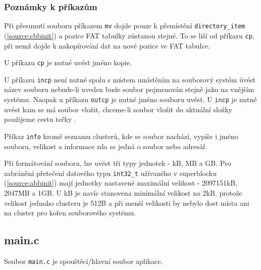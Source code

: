 \documentclass[12pt]{report}
\begin{document}
	\subsubsection{Poznámky k příkazům}
	\par Při přesunutí souboru příkazem \texttt{mv} dojde pouze k přemístění \texttt{directory\_item} (\ref{source:cbbinit}) a pozice FAT tabulky zůstanou stejné. To se liší od příkazu \texttt{cp}, při nemž dojde k nakopírování dat na nové pozice ve FAT tabulce.
	\par U příkazu \texttt{cp} je nutné uvést jméno kopie.
	\par U příkazu \texttt{incp} není nutné spolu s místem umístěním na souborový systém úvést název souboru nebude-li uveden bude soubor pojmenován stejně jako na vnějším systému. Naopak u příkazu \texttt{outcp} je nutné jméno souboru uvést. U \texttt{incp} je nutné uvést kam se má soubor vložit, chceme-li soubor vložit do aktuální složky použijeme cestu tečky .
	\par Příkaz \texttt{info} kromě seznamu clusterů, kde se soubor nachází, vypíše i jméno souboru, velikost a informace zda se jedná o soubor nebo adresář.
	\par Při formátování souboru, lze uvést tři typy jednotek - kB, MB a GB. Pro zabránění přetečení datového typu \texttt{int32\_t} užívaného v superblocku (\ref{source:abbinit}) mají jednotky nastavené maximální velikost - 2097151kB, 2047MB a 1GB. U kB je navíc stanovena minimální velikost na 2kB, protože velikost jednoho clusteru je 512B a při menší velikosti by nebylo dost místa ani na cluster pro kořen souborového systému.


	\subsection*{main.c}
	\par Soubor \texttt{main.c} je spouštěcí/hlavní soubor aplikace.
\end{document}
